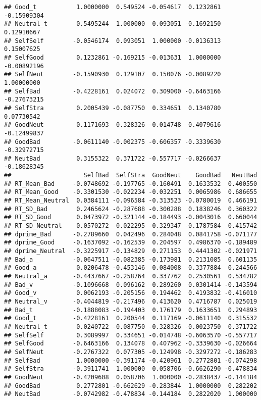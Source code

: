 \documentclass[man]{apa6}
\begin{document}
\begin{verbatim}
## Good_t           1.0000000  0.549524 -0.054617  0.1232861 -0.15909304
## Neutral_t        0.5495244  1.000000  0.093051 -0.1692150  0.12910667
## SelfSelf        -0.0546174  0.093051  1.000000 -0.0136313  0.15007625
## SelfGood         0.1232861 -0.169215 -0.013631  1.0000000 -0.00892196
## SelfNeut        -0.1590930  0.129107  0.150076 -0.0089220  1.00000000
## SelfBad         -0.4228161  0.024072  0.309000 -0.6463166 -0.27673215
## SelfStra         0.2005439 -0.087750  0.334651  0.1340780  0.07730542
## GoodNeut         0.1171693 -0.328326 -0.014748  0.4079616 -0.12499837
## GoodBad         -0.0611140 -0.002375 -0.606357 -0.3339630 -0.32972715
## NeutBad          0.3155322  0.371722 -0.557717 -0.0266637 -0.18628345
##                    SelfBad  SelfStra  GoodNeut    GoodBad   NeutBad
## RT_Mean_Bad     -0.0748692 -0.197765 -0.160491  0.1633532  0.400550
## RT_Mean_Good    -0.3301530 -0.022234 -0.032251  0.0065986  0.686655
## RT_Mean_Neutral  0.0384111 -0.096584 -0.313523 -0.0780019  0.466191
## RT_SD_Bad        0.2465624 -0.287688 -0.300288  0.1838246  0.360322
## RT_SD_Good       0.0473972 -0.321144 -0.184493 -0.0043016  0.660044
## RT_SD_Neutral    0.0570272 -0.022295 -0.329347 -0.1787584  0.415742
## dprime_Bad      -0.2789660  0.042496  0.284048  0.0841758 -0.071177
## dprime_Good     -0.1637092 -0.162539  0.204597  0.4986370 -0.189489
## dprime_Neutral  -0.3225917 -0.134829  0.271153  0.4441302 -0.021971
## Bad_a           -0.0647511 -0.082385 -0.173981  0.2131085  0.601135
## Good_a           0.0206478 -0.453146  0.084008  0.3377884  0.244566
## Neutral_a       -0.4437667 -0.258764  0.337762  0.2530561  0.534782
## Bad_v           -0.1096668  0.096162  0.289260  0.0301414 -0.143594
## Good_v           0.0062193 -0.205156  0.194462  0.4193832 -0.416010
## Neutral_v       -0.4044819 -0.217496  0.413620  0.4716787  0.025019
## Bad_t           -0.1888083 -0.194403  0.176179  0.1633651  0.294893
## Good_t          -0.4228161  0.200544  0.117169 -0.0611140  0.315532
## Neutral_t        0.0240722 -0.087750 -0.328326 -0.0023750  0.371722
## SelfSelf         0.3089997  0.334651 -0.014748 -0.6063570 -0.557717
## SelfGood        -0.6463166  0.134078  0.407962 -0.3339630 -0.026664
## SelfNeut        -0.2767322  0.077305 -0.124998 -0.3297272 -0.186283
## SelfBad          1.0000000 -0.391174 -0.420961  0.2772801 -0.074298
## SelfStra        -0.3911741  1.000000  0.058706 -0.6626290 -0.478834
## GoodNeut        -0.4209608  0.058706  1.000000 -0.2838437 -0.144184
## GoodBad          0.2772801 -0.662629 -0.283844  1.0000000  0.282202
## NeutBad         -0.0742982 -0.478834 -0.144184  0.2822020  1.000000
\end{verbatim}
\end{document}
